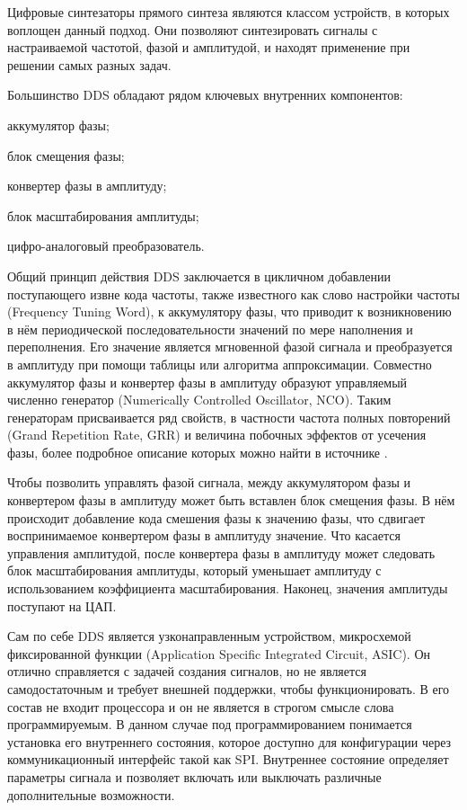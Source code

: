 \documentclass{report}
\begin{document}
Цифровые синтезаторы прямого синтеза являются классом устройств, в которых воплощен данный подход. Они позволяют синтезировать сигналы с настраиваемой частотой, фазой и амплитудой, и находят применение при решении самых разных задач.

Большинство DDS обладают рядом ключевых внутренних компонентов:

\begin{enummarker}
    \item аккумулятор фазы;
    \item блок смещения фазы;
    \item конвертер фазы в амплитуду;
    \item блок масштабирования амплитуды;
    \item цифро-аналоговый преобразователь.
\end{enummarker}

Общий принцип действия DDS заключается в цикличном добавлении поступающего извне кода частоты, также известного как слово настройки частоты (Frequency Tuning Word), к аккумулятору фазы, что приводит к возникновению в нём периодической последовательности значений по мере наполнения и переполнения. Его значение является мгновенной фазой сигнала и преобразуется в амплитуду при помощи таблицы или алгоритма аппроксимации. Совместно аккумулятор фазы и конвертер фазы в амплитуду образуют управляемый численно генератор (Numerically Controlled Oscillator, NCO). Таким генераторам присваивается ряд свойств, в частности частота полных повторений (Grand Repetition Rate, GRR) и величина побочных эффектов от усечения фазы, более подробное описание которых можно найти в источнике \cite{dds_tutorial}.

Чтобы позволить управлять фазой сигнала, между аккумулятором фазы и конвертером фазы в амплитуду может быть вставлен блок смещения фазы. В нём происходит добавление кода смешения фазы к значению фазы, что сдвигает воспринимаемое конвертером фазы в амплитуду значение. Что касается управления амплитудой, после конвертера фазы в амплитуду может следовать блок масштабирования амплитуды, который уменьшает амплитуду с использованием коэффициента масштабирования. Наконец, значения амплитуды поступают на ЦАП.

Сам по себе DDS является узконаправленным устройством, микросхемой фиксированной функции (Application Specific Integrated Circuit, ASIC). Он отлично справляется с задачей создания сигналов, но не является самодостаточным и требует внешней поддержки, чтобы функционировать. В его состав не входит процессора и он не является в строгом смысле слова программируемым. В данном случае под программированием понимается установка его внутреннего состояния, которое доступно для конфигурации через коммуникационный интерфейс такой как SPI. Внутреннее состояние определяет параметры сигнала и позволяет включать или выключать различные дополнительные возможности.
\end{document}
